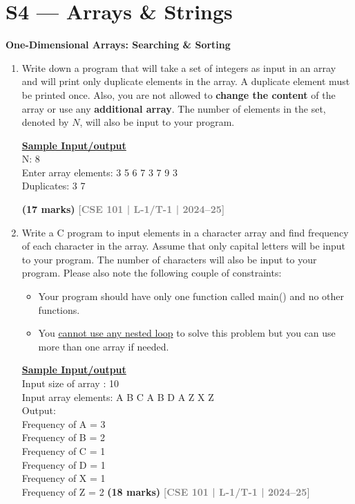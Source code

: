 \documentclass[12pt,a3paper]{article}
\newcommand{\yr}[1]{\hfill\textcolor{gray}{\small\textbf{[#1]}}}
\newcommand{\mk}[1]{\textcolor{orange!70!black}{\small\textbf{(#1 marks)}}}
\newcommand{\subtopic}[2]{%
  \vspace{10pt}
  \noindent\begin{tcolorbox}[colback=#1!8,colframe=#1,boxrule=0.6pt,arc=4pt,
    left=6pt,right=6pt,top=4pt,bottom=4pt]
    \small\bfseries\textcolor{#1}{#2}
  \end{tcolorbox}
  \vspace{2pt}
}
\begin{document}
\section{S4 --- Arrays \& Strings}
\label{sec:S4}

\subtopic{cB}{One-Dimensional Arrays: Searching \& Sorting}
\label{sub:s4-1darray}

\begin{enumerate}

    \item Write down a program that will take a set of integers as input in an array and will print only duplicate elements in the array. A duplicate element must be printed once. Also, you are not allowed to \textbf{change the content} of the array or use any \textbf{additional array}. The number of elements in the set, denoted by $N$, will also be input to your program.
    
    \vspace{0.3cm}
    \noindent \underline{\textbf{Sample Input/output}} \\
    N: 8 \\
    Enter array elements: 3 5 6 7 3 7 9 3 \\
    Duplicates: 3 7
    
    \vspace{0.6cm}
    \mk{17} \yr{CSE 101 | L-1/T-1 | 2024--25}

    
    \item Write a C program to input elements in a character array and find frequency of each character in the array. Assume that only capital letters will be input to your program. The number of characters will also be input to your program. Please also note the following couple of constraints:
    
    \begin{itemize}
        \item[(i)] Your program should have only one function called main() and no other functions.
        \item[(ii)] You \underline{cannot use any nested loop} to solve this problem but you can use more than one array if needed.
    \end{itemize}
    
    \vspace{0.3cm}
    \noindent \underline{\textbf{Sample Input/output}} \\
    Input size of array : 10 \\
    Input array elements: A B C A B D A Z X Z \\
    Output: \\
    Frequency of A = 3 \\
    Frequency of B = 2 \\
    Frequency of C = 1 \\
    Frequency of D = 1 \\
    Frequency of X = 1 \\
    Frequency of Z = 2
\mk{18} \yr{CSE 101 | L-1/T-1 | 2024--25}




\end{enumerate}
\end{document}
